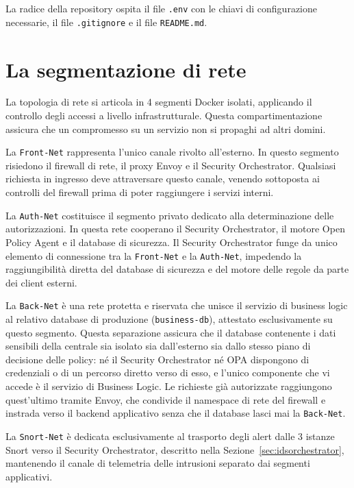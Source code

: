 La radice della repository ospita il file \texttt{.env} con le chiavi di configurazione necessarie, il file \texttt{.gitignore} e il file \texttt{README.md}.

\section{La segmentazione di rete}

La topologia di rete si articola in 4 segmenti Docker isolati, applicando il controllo degli accessi a livello infrastrutturale. Questa compartimentazione assicura che un compromesso su un servizio non si propaghi ad altri domini.

La \texttt{Front-Net} rappresenta l'unico canale rivolto all'esterno. In questo segmento risiedono il firewall di rete, il proxy Envoy e il Security Orchestrator. Qualsiasi richiesta in ingresso deve attraversare questo canale, venendo sottoposta ai controlli del firewall prima di poter raggiungere i servizi interni.

La \texttt{Auth-Net} costituisce il segmento privato dedicato alla determinazione delle autorizzazioni. In questa rete cooperano il Security Orchestrator, il motore Open Policy Agent e il database di sicurezza. Il Security Orchestrator funge da unico elemento di connessione tra la \texttt{Front-Net} e la \texttt{Auth-Net}, impedendo la raggiungibilità diretta del database di sicurezza e del motore delle regole da parte dei client esterni.

La \texttt{Back-Net} è una rete protetta e riservata che unisce il servizio di business logic al relativo database di produzione (\texttt{business-db}), attestato esclusivamente su questo segmento. Questa separazione assicura che il database contenente i dati sensibili della centrale sia isolato sia dall'esterno sia dallo stesso piano di decisione delle policy: né il Security Orchestrator né OPA dispongono di credenziali o di un percorso diretto verso di esso, e l'unico componente che vi accede è il servizio di Business Logic. Le richieste già autorizzate raggiungono quest'ultimo tramite Envoy, che condivide il namespace di rete del firewall e instrada verso il backend applicativo senza che il database lasci mai la \texttt{Back-Net}. 

La \texttt{Snort-Net} è dedicata esclusivamente al trasporto degli alert dalle 3 istanze Snort verso il Security Orchestrator, descritto nella Sezione~\ref{sec:idsorchestrator}, mantenendo il canale di telemetria delle intrusioni separato dai segmenti applicativi.

